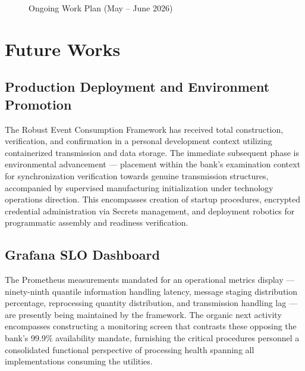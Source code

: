 \begin{figure}[H]
\centering
{}
\caption{Ongoing Work Plan (May -- June 2026)}
\end{figure}
\section{Future Works}

\subsection{Production Deployment and Environment Promotion}
The Robust Event Consumption Framework has received total construction, verification, and 
confirmation in a personal development context utilizing containerized transmission and data 
storage. The immediate subsequent phase is environmental advancement --- placement within 
the bank's examination context for synchronization verification towards genuine transmission 
structures, accompanied by supervised manufacturing initialization under technology 
operations direction. This encompasses creation of startup procedures, encrypted credential 
administration via Secrets management, and deployment robotics for programmatic assembly 
and readiness verification.

\subsection{Grafana SLO Dashboard}
The Prometheus measurements mandated for an operational metrics display --- ninety-ninth 
quantile information handling latency, message staging distribution percentage, reprocessing 
quantity distribution, and transmission handling lag --- are presently being maintained by 
the framework. The organic next activity encompasses constructing a monitoring screen that 
contrasts these opposing the bank's 99.9\% availability mandate, furnishing the critical 
procedures personnel a consolidated functional perspective of processing health spanning 
all implementations consuming the utilities.

